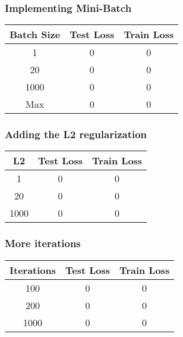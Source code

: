 \documentclass[
	letterpaper, %
	10pt, %
]{class}
\begin{document}
\subsubsection{Implementing Mini-Batch}

\begin{center}
	\begin{tabular}{ |c|c|c| }
		\hline
		Batch Size & Test Loss & Train Loss \\
		\hline
		1          & 0         & 0          \\
		20         & 0         & 0          \\
		1000       & 0         & 0          \\
		Max        & 0         & 0          \\
		\hline
	\end{tabular}
\end{center}

\subsubsection{Adding the L2 regularization}

\begin{center}
	\begin{tabular}{ |c|c|c| }
		\hline
		L2   & Test Loss & Train Loss \\
		\hline
		1    & 0         & 0          \\
		20   & 0         & 0          \\
		1000 & 0         & 0          \\
		\hline
	\end{tabular}
\end{center}

\subsubsection{More iterations}

\begin{center}
	\begin{tabular}{ |c|c|c| }
		\hline
		Iterations & Test Loss & Train Loss \\
		\hline
		100        & 0         & 0          \\
		200        & 0         & 0          \\
		1000       & 0         & 0          \\
		\hline
	\end{tabular}
\end{center}
\end{document}
